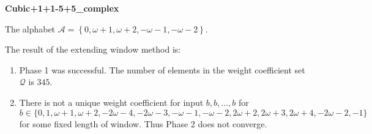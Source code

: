 \begin{exmp}
\textbf{ Cubic+1+1-5+5\_complex }

\label{ex:Cubic+1+1-5+5complex}

The alphabet $\mathcal{A} =\left\{0, \omega + 1, \omega + 2, -\omega - 1, -\omega - 2\right\}$.

The result of the extending window method is:
\begin{enumerate}
    \item Phase 1 was successful.
The number of elements in the weight coefficient set $\mathcal{Q}$ is $345$.

    \item There is not a unique weight coefficient for input $b,b,\dots,b$ for $b\in\{0, 1, \omega + 1, \omega + 2, -2\omega - 4, -2\omega - 3, -\omega - 1, -\omega - 2, 2\omega + 2, 2\omega + 3, 2\omega + 4, -2\omega - 2, -1\}$ for some fixed length of window. Thus Phase 2 does not converge.

\end{enumerate}
\end{exmp}
